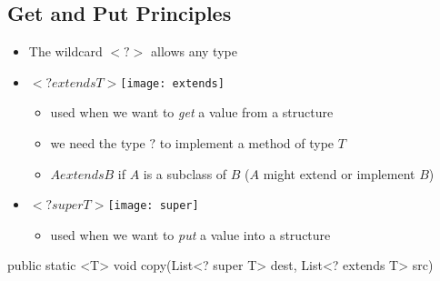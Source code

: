
\begin{slide}
\section[-2]{Get and Put Principles}

\begin{PauseHighLight}
  \begin{itemize}
  \item The wildcard \jl$<?>$ allows any type\pause
  \item \jl$<? extends T>$\hfill\texttt{[image: extends]}
    \begin{itemize}
    \item used when we want to \emph{get} a value from a structure
    \item we need the type \jl$?$ to implement a method of type
      \jl$T$
    \item \jl$A extends B$ if \jl$A$ is a subclass of \jl$B$ (\jl$A$ might
      extend or implement \jl$B$)\pause
    \end{itemize}
  \item \jl$<? super T>$\hfill\texttt{[image: super]}
    \begin{itemize}
    \item used when we want to \emph{put} a value into a structure\pause
    \end{itemize}
  \end{itemize}
\begin{java}
public static <T> void copy(List<? super T> dest, List<? extends T> src)
\end{java}\pause
\end{PauseHighLight}

\end{slide}





